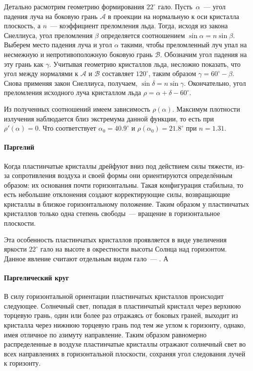 Детально расмотрим геометрию формирования $22^\circ$ гало. Пусть~$\alpha$~--- угол падения луча на боковую грань $\mathcal{A}$ в проекции на нормальную к оси кристалла плоскость, а $n$~--- коэффициент преломления льда. Тогда, исходя из закона Снеллиуса, угол преломления $\beta$ определяется соотношением $\sin \alpha = n \sin \beta$. Выберем место падения луча и угол $\alpha$ такими, чтобы преломленный луч упал на несмежную и непротивоположную боковую грань $\mathcal{B}$. Обозначим угол падения на эту грань как $\gamma$. Учитывая геометрию кристаллов льда, несложно показать, что угол между нормалями к $\mathcal{A}$ и $\mathcal{B}$ составляет $120^\circ$, таким образом $\gamma = 60^\circ - \beta$. Снова применяя закон Снеллиуса, получаем, $\sin \delta = n \sin \gamma$. Окончательно, угол преломления исходного луча кристаллом льда $\rho =  \alpha + \delta - 60^\circ$.

Из полученных соотношений имеем зависимость $\rho(\alpha)$. Максимум плотности излучения наблюдается близ экстремума данной функции, то есть при $\rho'(\alpha) = 0$. Что соответствует $\alpha_0 = 40.9^\circ$ и $\rho(\alpha_0) = 21.8^\circ$ при $n=1.31$. 

\paragraph{Паргелий}

Когда пластинчатые кристаллы дрейфуют вниз под действием силы тяжести, из-за сопротивления воздуха и своей формы они ориентируются определённым образом: их основания почти горизонтальны. Такая конфигурация стабильна, то есть небольшие отклонения создают корректирующие силы, возвращающие кристаллы в близкое горизонтальному положение. Таким образом у пластинчатых кристаллов только одна степень свободы~--- вращение в горизонтальное плоскости.

Эта особенность пластинчатых кристаллов проявляется в виде увеличения яркости $22^\circ$ гало на высоте в окрестности высоты Солнца над горизонтом. Данное явление считают отдельным видом гало~--- . А 

\paragraph{Паргелический круг}

В силу горизонтальной ориентации пластинчатых кристаллов происходит следующее. Солнечный свет, попадая в пластинчатый кристалл через верхнюю торцевую грань, один или более раз отражаясь от боковых граней, выходит из кристалла через нижнюю торцевую грань под тем же углом к горизонту, однако, имея отличное по азимуту направление. Таким образом равномерно распределенные в воздухе пластинчатые кристаллы отражают солнечный свет во всех направлениях в горизонтальной плоскости, сохраняя угол следования лучей к горизонту.

